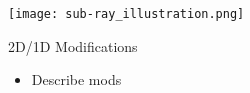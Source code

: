 
\begin{frame}
    
\texttt{[image: sub-ray\_illustration.png]}

\end{frame}


\begin{frame}[t]{2D/1D Modifications}
    
    \begin{itemize}
        \item Describe mods
    \end{itemize}

\end{frame}